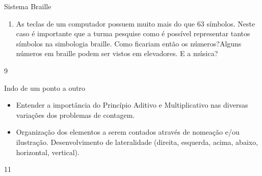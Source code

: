 \begin{answer}{Sistema Braille}
{\begin{enumerate}
\item As teclas de um computador possuem muito mais do que $63$ símbolos. Neste caso é importante que a turma pesquise como é possível representar tantos símbolos na simbologia braille. Como ficariam então os números?Alguns números em braille podem ser vistos em elevadores. E a música?            
\end{enumerate}
}{9}
\end{answer}
\clearmargin

\begin{objectives}{Indo de um ponto a outro}
{
\begin{itemize}
\item Entender a importância do Princípio Aditivo e Multiplicativo nas diversas variações dos problemas de contagem. 
\item Organização dos elementos a serem contados através de nomeação e/ou ilustração. Desenvolvimento de lateralidade (direita, esquerda, acima, abaixo, horizontal, vertical).
\end{itemize}
}{1}{1}
\end{objectives}
\mspace{-1.25em}
